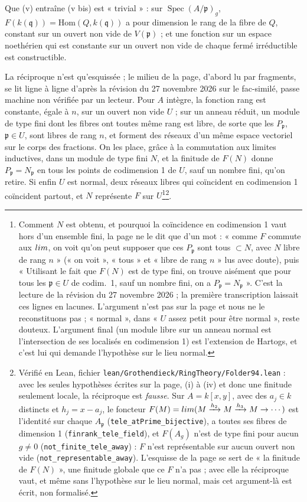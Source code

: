 \documentclass[11pt,a4paper]{article}
\begin{document}
Que (v) entraîne (v bis) est « trivial » : sur $\operatorname{Spec}
(A/\mathfrak{p})_g$, $F(k(\mathfrak{q})) = \mathrm{Hom}(Q, k(\mathfrak{q}))$ a
pour dimension le rang de la fibre de $Q$, constant sur un ouvert non vide de
$V(\mathfrak{p})$ ; et une fonction sur un espace noethérien qui est constante
sur un ouvert non vide de chaque fermé irréductible est constructible.

La réciproque n'est qu'esquissée ; le milieu de la page, d'abord lu par
fragments, se lit ligne à ligne d'après la révision du 27 novembre 2026 sur le
fac-similé, passe machine non vérifiée par un lecteur.
Pour $A$ intègre, la fonction rang est constante,
égale à $n$, sur un ouvert non vide $U$ ; sur un anneau réduit, un module de
type fini dont les fibres ont toutes même rang est libre, de sorte que les
$P_{\mathfrak{p}}$, $\mathfrak{p} \in U$, sont libres de rang $n$, et forment
des réseaux d'un même espace vectoriel sur le corps des fractions. On les
place, grâce à la commutation aux limites inductives, dans un module de type
fini $N$, et la finitude de $F(N)$ donne $P_{\mathfrak{p}} = N_{\mathfrak{p}}$
en tous les points de codimension 1 de $U$, sauf un nombre fini, qu'on
retire. Si enfin $U$ est normal, deux réseaux libres qui coïncident en
codimension 1 coïncident partout, et $N$ représente $F$ sur
$U$\footnote{Comment $N$ est obtenu, et pourquoi la coïncidence en
codimension 1 vaut hors d'un ensemble fini, la page ne le dit que d'un mot :
« comme $F$ commute aux $\varinjlim$, on voit qu'on peut supposer que ces
$P_{\mathfrak{p}}$ sont tous $\subset N$, avec $N$ libre de rang $n$ » (« on
voit », « tous » et « libre de rang $n$ » lus avec doute), puis « Utilisant le
fait que $F(N)$ est de type fini, on trouve aisément que pour tous les
$\mathfrak{p} \in U$ de codim.\ 1, sauf un nombre fini, on a $P_{\mathfrak{p}} =
N_{\mathfrak{p}}$ ». C'est la lecture de la révision du 27 novembre 2026 ; la
première transcription laissait ces lignes en lacunes. L'argument n'est pas
sur la page et nous ne le reconstituons pas ; « normal », dans « $U$ assez
petit pour être normal », reste douteux. L'argument final (un module
libre sur un anneau normal est l'intersection de ses localisés en
codimension 1) est l'extension de Hartogs, et c'est lui qui demande
l'hypothèse sur le lieu normal.}\footnote{Vérifié en Lean, fichier
\texttt{lean/Grothendieck/RingTheory/Folder94.lean} : avec les seules hypothèses écrites
sur la page, (i) à (iv) et donc une finitude seulement locale, la réciproque
est \emph{fausse}. Sur $A = k[x, y]$, avec des $a_j \in k$ distincts et $h_j = x -
a_j$, le foncteur $F(M) = \varinjlim(M \xrightarrow{h_2} M \xrightarrow{h_3} M
\to \cdots)$ est l'identité sur chaque $A_{\mathfrak{p}}$
(\texttt{tele\_atPrime\_bijective}), a toutes ses fibres de dimension 1
(\texttt{finrank\_tele\_field}), et $F(A_g)$ n'est de type fini pour aucun $g
\neq 0$ (\texttt{not\_finite\_tele\_away}) : $F$ n'est représentable sur aucun
ouvert non vide (\texttt{not\_representable\_away}). L'esquisse de la page se
sert de « la finitude de $F(N)$ », une finitude globale que ce $F$ n'a pas ;
avec elle la réciproque vaut, et même sans l'hypothèse sur le lieu normal,
mais cet argument-là est écrit, non formalisé.}.
\end{document}
